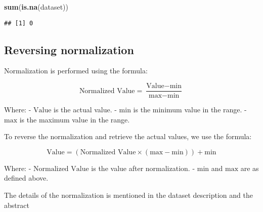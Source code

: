 \documentclass[
]{article}
\newenvironment{Shaded}{\begin{snugshade}}{\end{snugshade}}
\newcommand{\FunctionTok}[1]{\textcolor[rgb]{0.13,0.29,0.53}{\textbf{#1}}}
\newcommand{\NormalTok}[1]{#1}
\begin{document}
\begin{Shaded}
\begin{Highlighting}[]
\FunctionTok{sum}\NormalTok{(}\FunctionTok{is.na}\NormalTok{(dataset))}
\end{Highlighting}
\end{Shaded}

\begin{verbatim}
## [1] 0
\end{verbatim}

\subsection{Reversing normalization}\label{reversing-normalization}

Normalization is performed using the formula:

\[
\text{Normalized Value} = \frac{\text{Value} - \text{min}}{\text{max} - \text{min}}
\]

Where: - \(\text{Value}\) is the actual value. - \(\text{min}\) is the
minimum value in the range. - \(\text{max}\) is the maximum value in the
range.

To reverse the normalization and retrieve the actual values, we use the
formula:

\[
\text{Value} = (\text{Normalized Value} \times (\text{max} - \text{min})) + \text{min}
\]

Where: - \(\text{Normalized Value}\) is the value after normalization. -
\(\text{min}\) and \(\text{max}\) are as defined above.

The details of the normalization is mentioned in the dataset description
and the abstract
\end{document}
